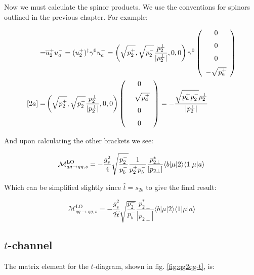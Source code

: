 			Now we must calculate the spinor products.  We use the conventions for spinors outlined in the
			previous chapter.  For example:

			\begin{align}
				[2a] = &\overline{u}^+_2u^-_a=(u^+_2)^\dagger\gamma^0u^-_a=\left(\sqrt{p^+_2},
				\sqrt{p^-_2}\frac{p^{\perp}_2}{|p_2^\perp|}, 0, 0\right)
				\gamma^0\left( \begin {array}{c} 0\\ \noalign{\medskip}0\\ \noalign{\medskip}0\\ \noalign{\medskip}-\sqrt{p^+_a}\end {array}\right)\\
				[2a] = &\left(\sqrt{p^+_2}, \sqrt{p^-_2}\frac{p^{\perp}_2}{|p_2^\perp|}, 0, 0\right)\left( \begin {array}{c} 0\\ \noalign{\medskip}-\sqrt{p^+_a}\\
				\noalign{\medskip}0\\ \noalign{\medskip}0\end {array}\right)=-\frac{\sqrt{p_a^+p_2^-}p_2^\perp}{|p_2^\perp|}
			\end{align}

			And upon calculating the other brackets we see:

			\begin{equation}
				\mathcal{M}_{qg\rightarrow qg, s}^{\text{LO}} = -\frac{g_s^2}{4}\sqrt{\frac{p_2^-}{p_b^-}}\frac{1}{p_2^+p_b^-} \frac{p_{2\perp}^*}{|p_{2\perp}|} \langle b | \mu | 2 \rangle \langle 1 | \mu | a \rangle
			\end{equation}

			Which can be simplified slightly since $\hat{t}=s_{2b}$ to give the final result:

			\begin{equation}
				\mathcal{M}_{qg\rightarrow qg, s}^{\text{LO}}=-\frac{g_s^2}{2\hat{t}}\sqrt{\frac{p_2^-}{p_b^-}}\frac{p_{2\perp}^*}
				{|p_{2\perp}|}\langle{b}|\mu|2\rangle\langle{1}|\mu|a\rangle
				\label{eqn:s-channel}
			\end{equation}

		\subsection{$t$-channel}

			The matrix element for the $t$-diagram, shown in fig. \eqref{fig:qg2qg-t}, is:

